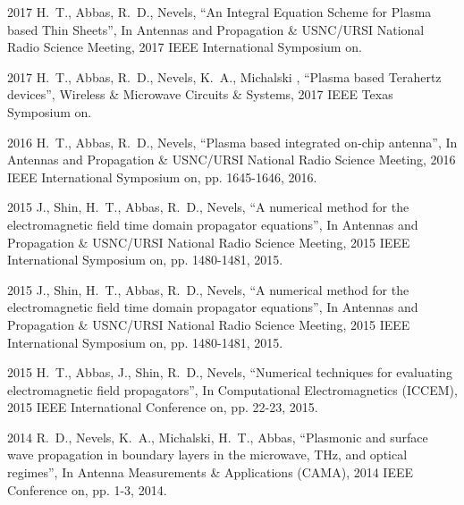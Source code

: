 \documentclass[10pt]{article}
\renewcommand{\section}[1]{\pagebreak[3]%
    \vspace{1.3\baselineskip}%
    \phantomsection\addcontentsline{toc}{section}{#1}%
    \noindent\llap{\scshape\smash{\parbox[t]{\marginparwidth}{\hyphenpenalty=10000\raggedright #1}}}%
    \vspace{-\baselineskip}\par}
\begin{document}
\begin{bibenum}
\item[2017] H.~T., Abbas, R.~D., Nevels, ``An Integral Equation Scheme for Plasma based Thin Sheets'', In Antennas and Propagation \& USNC/URSI National Radio Science Meeting, 2017 IEEE International Symposium on.

\item[2017] H.~T., Abbas, R.~D., Nevels, K.~A., Michalski , ``Plasma based Terahertz devices'', Wireless \& Microwave Circuits \& Systems, 2017 IEEE Texas Symposium on.

\item[2016] H.~T., Abbas, R.~D., Nevels, ``Plasma based integrated on-chip antenna'', In Antennas and Propagation \& USNC/URSI National Radio Science Meeting, 2016 IEEE International Symposium on, pp. 1645-1646, 2016.

\item[2015] J., Shin, H.~T., Abbas, R.~D., Nevels, ``A numerical method for the electromagnetic field time domain propagator equations'', In Antennas and Propagation \& USNC/URSI National Radio Science Meeting, 2015 IEEE International Symposium on, pp. 1480-1481, 2015.

\item[2015] J., Shin, H.~T., Abbas, R.~D., Nevels, ``A numerical method for the electromagnetic field time domain propagator equations'', In Antennas and Propagation \& USNC/URSI National Radio Science Meeting, 2015 IEEE International Symposium on, pp. 1480-1481, 2015.

\item[2015] H.~T., Abbas, J., Shin, R.~D., Nevels, ``Numerical techniques for evaluating electromagnetic field propagators'', In Computational Electromagnetics (ICCEM), 2015 IEEE International Conference on, pp. 22-23, 2015.

\item[2014] R.~D., Nevels, K.~A., Michalski, H.~T., Abbas, ``Plasmonic and surface wave propagation in boundary layers in the microwave, THz, and optical regimes'', In Antenna Measurements \& Applications (CAMA), 2014 IEEE Conference on, pp. 1-3, 2014.

\end{bibenum}

\section{Talks}
\end{document}
